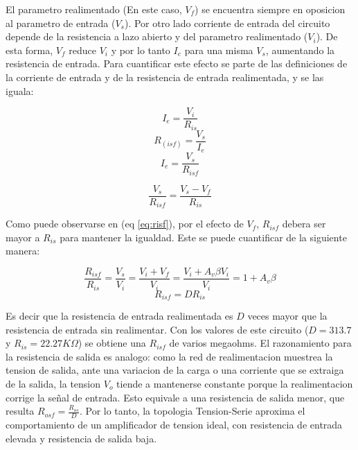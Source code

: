 \documentclass[11pt,a4paper]{article}
\begin{document}
El parametro realimentado (En este caso, \(V_f\)) se encuentra siempre en oposicion al parametro de entrada (\(V_s\)). Por otro lado corriente de entrada del circuito depende de la resistencia a lazo abierto y del parametro realimentado (\(V_i\)). De esta forma, \(V_f\) reduce \(V_i\) y por lo tanto \(I_e\) para una misma \(V_s\), aumentando la resistencia de entrada. Para cuantificar este efecto se parte de las definiciones de la corriente de entrada y de la resistencia de entrada realimentada, y se las iguala:

\begin{equation}
I_e = \frac{V_i}{R_{is}}
\end{equation}
\begin{equation}
R_(isf) = \frac{V_s}{I_e}
\end{equation}
\begin{equation}
I_e = \frac{V_s}{R_{isf}}
\end{equation}

\begin{equation}
\frac{V_s}{R_{isf}} = \frac{V_s - V_f}{R_{is}}
\label{eq:risf}
\end{equation}

Como puede observarse en (eq \ref{eq:risf}), por el efecto de \(V_f\), \(R_{isf}\) debera ser mayor a \(R_{is}\) para mantener la igualdad. Este se puede cuantificar de la siguiente manera:

\begin{equation}
\frac{R_{isf}}{R_{is}} = \frac{V_s}{V_i} = \frac{V_i + V_f}{V_i} =  \frac{V_i + A_v \beta V_i}{V_i} = 1 +A_v \beta
\end{equation}
\begin{equation}
{R_{isf}} = D{R_{is}}
\end{equation}

Es decir que la resistencia de entrada realimentada es \(D\) veces mayor que la resistencia de entrada sin realimentar. Con los valores de este circuito (\(D = 313.7\) y \(R_{is} = 22.27K\Omega\)) se obtiene una \(R_{isf}\) de varios megaohms. El razonamiento para la resistencia de salida es analogo: como la red de realimentacion muestrea la tension de salida, ante una variacion de la carga o una corriente que se extraiga de la salida, la tension \(V_o\) tiende a mantenerse constante porque la realimentacion corrige la señal de entrada. Esto equivale a una resistencia de salida menor, que resulta \(R_{osf} = \frac{R_{os}}{D}\). Por lo tanto, la topologia Tension-Serie aproxima el comportamiento de un amplificador de tension ideal, con resistencia de entrada elevada y resistencia de salida baja.
\end{document}
